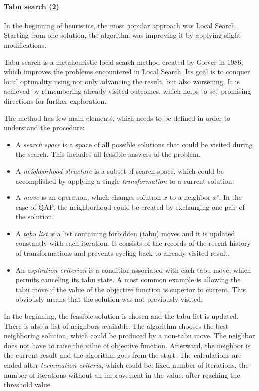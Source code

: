 \paragraph{Tabu search (2)}

In the beginning of heuristics, the most popular approach was Local Search.
Starting from one solution, the algorithm was improving it by applying slight modifications.

Tabu search is a metaheuristic local search method created by Glover \cite{glover1986future} in 1986, which improves the problems encountered in Local Search.
Its goal is to conquer local optimality using not only advancing the result, but also worsening.
It is achieved by remembering already visited outcomes, which helps to see promising directions for further exploration.

The method has few main elements, which needs to be defined in order to understand the procedure:
\begin{itemize}
  \item A \textit{search space} is a space of all possible solutions that could be visited during the search. This includes all feasible answers of the problem.
  \item A \textit{neighborhood structure} is a subset of search space, which could be accomplished by applying a single \textit{transformation} to a current solution.
  \item A \textit{move} is an operation, which changes solution $x$ to a neighbor $x'$. In the case of QAP, the neighborhood could be created by exchanging one pair of the solution.
  \item A \textit{tabu list} is a list containing forbidden (tabu) moves and it is updated constantly with each iteration. It consists of the records of the recent history of transformations and prevents cycling back to already visited result.
  \item An \textit{aspiration criterion} is a condition associated with each tabu move, which permits canceling its tabu state. A most common example is allowing the tabu move if the value of the objective function is superior to current. This obviously means that the solution was not previously visited.
\end{itemize}

In the beginning, the feasible solution is chosen and the tabu list is updated.
There is also a list of neighbors available.
The algorithm chooses the best neighboring solution, which could be produced by a non-tabu move.
The neighbor does not have to raise the value of objective function.
Afterward, the neighbor is the current result and the algorithm goes from the start.
The calculations are ended after \textit{termination criteria}, which could be: fixed number of iterations, the number of iterations without an improvement in the value, after reaching the threshold value.

